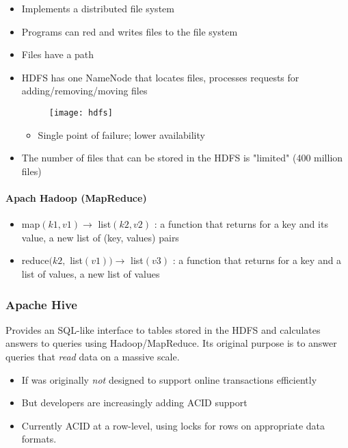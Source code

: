 \begin{itemize}
    \item Implements a distributed file system
    \item Programs can red and writes files to the file system
    \item Files have a path
    \item HDFS has one NameNode that locates files, processes requests for adding/removing/moving files
    \begin{figure}[H]
        \centering
        \texttt{[image: hdfs]}
    \end{figure}
    \begin{itemize}
        \item Single point of failure; lower availability
    \end{itemize}
    \item The number of files that can be stored in the HDFS is "limited" (400 million files)
\end{itemize}

\paragraph{Apach Hadoop (MapReduce)}

\begin{itemize}
    \item {} map$(k1, v1) \rightarrow$ list$(k2, v2)$ : a function that returns for a key and its value, a new list of (key, values) pairs
    \item {} reduce$(k2,$ list$(v1)) \rightarrow$ list$(v3)$ : a function that returns for a key and a list of values, a new list of values
\end{itemize}

\subsubsection{Apache Hive}

Provides an SQL-like interface to tables stored in the HDFS and calculates answers to queries using Hadoop/MapReduce. Its original purpose is to answer queries that \textit{read} data on a massive scale.

\begin{itemize}
    \item If was originally \textit{not} designed to support online transactions efficiently
    \item But developers are increasingly adding ACID support
    \item Currently ACID at a row-level, using locks for rows on appropriate data formats.
\end{itemize}

